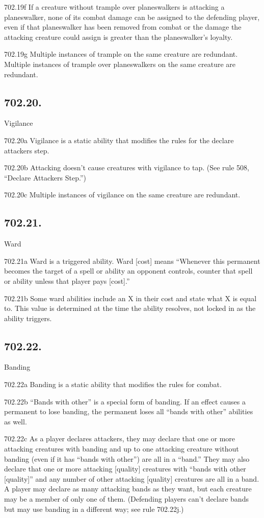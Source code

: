 702.19f If a creature without trample over planeswalkers is attacking a planeswalker, none of its combat damage can be assigned to the defending player, even if that planeswalker has been removed from combat or the damage the attacking creature could assign is greater than the planeswalker’s loyalty.

702.19g Multiple instances of trample on the same creature are redundant. Multiple instances of trample over planeswalkers on the same creature are redundant.

\subsection*{702.20.}
Vigilance

702.20a Vigilance is a static ability that modifies the rules for the declare attackers step.

702.20b Attacking doesn’t cause creatures with vigilance to tap. (See rule 508, “Declare Attackers Step.”)

702.20c Multiple instances of vigilance on the same creature are redundant.

\subsection*{702.21.}
Ward

702.21a Ward is a triggered ability. Ward [cost] means “Whenever this permanent becomes the target of a spell or ability an opponent controls, counter that spell or ability unless that player pays [cost].”

702.21b Some ward abilities include an X in their cost and state what X is equal to. This value is determined at the time the ability resolves, not locked in as the ability triggers.

\subsection*{702.22.}
Banding

702.22a Banding is a static ability that modifies the rules for combat.

702.22b “Bands with other” is a special form of banding. If an effect causes a permanent to lose banding, the permanent loses all “bands with other” abilities as well.

702.22c As a player declares attackers, they may declare that one or more attacking creatures with banding and up to one attacking creature without banding (even if it has “bands with other”) are all in a “band.” They may also declare that one or more attacking [quality] creatures with “bands with other [quality]” and any number of other attacking [quality] creatures are all in a band. A player may declare as many attacking bands as they want, but each creature may be a member of only one of them. (Defending players can’t declare bands but may use banding in a different way; see rule 702.22j.)

